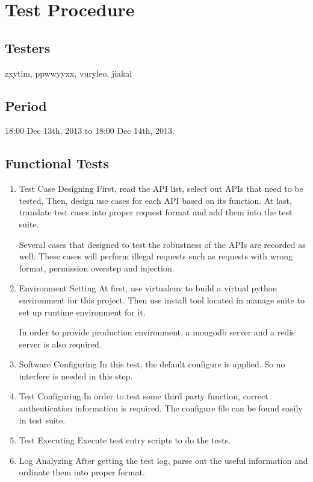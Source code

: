 \section{Test Procedure}
\label{sec:test_procedure}
  \subsection{Testers}
    zxytim, ppwwyyxx, vuryleo, jiakai
  \subsection{Period}
    18:00 Dec 13th, 2013 to 18:00 Dec 14th, 2013.
  \subsection{Functional Tests}
\begin{enumerate}

    \item Test Case Designing
      First, read the API list, select out APIs that need to be tested.
      Then, design use cases for each API based on its function.
      At last, translate test cases into proper request format and add them into the test suite.

      Several cases that designed to test the robustness of the APIs are recorded as well.
      These cases will perform illegal requests such as requests with wrong format, permission overstep and injection.
    \item Environment Setting
      At first, use virtualenv to build a virtual python environment for this project.
      Then use install tool located in manage suite to set up runtime environment for it.

      In order to provide production environment, a mongodb server and a redis server is also required.
    \item Software Configuring
      In this test, the default configure is applied. So no interfere is needed in this step.
    \item Test Configuring
      In order to test some third party function, correct authentication information is required.
      The configure file can be found easily in test suite.
    \item Test Executing
      Execute test entry scripts to do the tests.
    \item Log Analyzing
      After getting the test log, parse out the useful information and ordinate them into proper format.

\end{enumerate}
